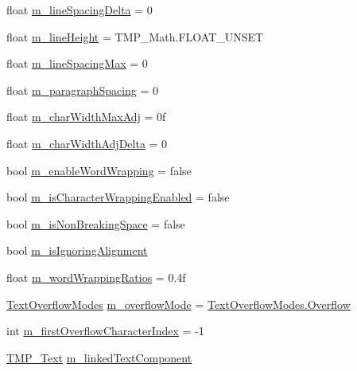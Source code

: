 \begin{DoxyCompactItemize}
float \mbox{\hyperlink{class_t_m_pro_1_1_t_m_p___text_ab3db3ed62e544c820228b7d0dba35249}{m\+\_\+line\+Spacing\+Delta}} = 0
\item 
float \mbox{\hyperlink{class_t_m_pro_1_1_t_m_p___text_ada65fb0c580df4486463e32136963fa6}{m\+\_\+line\+Height}} = T\+M\+P\+\_\+\+Math.\+F\+L\+O\+A\+T\+\_\+\+U\+N\+S\+ET
\item 
float \mbox{\hyperlink{class_t_m_pro_1_1_t_m_p___text_ab205ccbd719bf4a13e5d88a53b29d62e}{m\+\_\+line\+Spacing\+Max}} = 0
\item 
float \mbox{\hyperlink{class_t_m_pro_1_1_t_m_p___text_a3ce47e110f853d8b4a77beec9e97710c}{m\+\_\+paragraph\+Spacing}} = 0
\item 
float \mbox{\hyperlink{class_t_m_pro_1_1_t_m_p___text_aab3d4f56cbb207190a0d7a094cf05727}{m\+\_\+char\+Width\+Max\+Adj}} = 0f
\item 
float \mbox{\hyperlink{class_t_m_pro_1_1_t_m_p___text_a4decb254f2446ec6108d2862f37fa28d}{m\+\_\+char\+Width\+Adj\+Delta}} = 0
\item 
bool \mbox{\hyperlink{class_t_m_pro_1_1_t_m_p___text_a9171d8020ae591ca1e3f754b1f1101a8}{m\+\_\+enable\+Word\+Wrapping}} = false
\item 
bool \mbox{\hyperlink{class_t_m_pro_1_1_t_m_p___text_a7e554e824559e35962f5fbda5795df76}{m\+\_\+is\+Character\+Wrapping\+Enabled}} = false
\item 
bool \mbox{\hyperlink{class_t_m_pro_1_1_t_m_p___text_a3f6dd2704d5d0dfab0c966b52dcb61e8}{m\+\_\+is\+Non\+Breaking\+Space}} = false
\item 
bool \mbox{\hyperlink{class_t_m_pro_1_1_t_m_p___text_ad3ff608ec120329a63a5a97d54b8316c}{m\+\_\+is\+Ignoring\+Alignment}}
\item 
float \mbox{\hyperlink{class_t_m_pro_1_1_t_m_p___text_a34b10f311beaa58158471d87b5bfe9f8}{m\+\_\+word\+Wrapping\+Ratios}} = 0.\+4f
\item 
\mbox{\hyperlink{namespace_t_m_pro_a7234b7b8868aa9f0174e7db46e272a17}{Text\+Overflow\+Modes}} \mbox{\hyperlink{class_t_m_pro_1_1_t_m_p___text_a165a9c32280a9843ef12e7566266a954}{m\+\_\+overflow\+Mode}} = \mbox{\hyperlink{namespace_t_m_pro_a7234b7b8868aa9f0174e7db46e272a17a129e8109f319870e328cc7a1d5b5cae3}{Text\+Overflow\+Modes.\+Overflow}}
\item 
int \mbox{\hyperlink{class_t_m_pro_1_1_t_m_p___text_a542b0652d61df4452f43594ac3639457}{m\+\_\+first\+Overflow\+Character\+Index}} = -\/1
\item 
\mbox{\hyperlink{class_t_m_pro_1_1_t_m_p___text}{T\+M\+P\+\_\+\+Text}} \mbox{\hyperlink{class_t_m_pro_1_1_t_m_p___text_a5e55047e52e3d8a469e9b2266795c4ed}{m\+\_\+linked\+Text\+Component}}

\end{DoxyCompactItemize}
